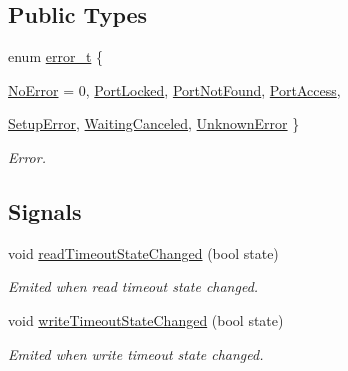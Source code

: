 \subsection*{Public Types}
\begin{DoxyCompactItemize}
\item 
enum \hyperlink{classmdt_abstract_port_ad4121bb930c95887e77f8bafa065a85e}{error\_\-t} \{ \par
\hyperlink{classmdt_abstract_port_ad4121bb930c95887e77f8bafa065a85eab898bd273effe5cb4ed1a399a2d4baad}{NoError} =  0, 
\hyperlink{classmdt_abstract_port_ad4121bb930c95887e77f8bafa065a85eaedd63daf0db75794bb8e8e467da9575c}{PortLocked}, 
\hyperlink{classmdt_abstract_port_ad4121bb930c95887e77f8bafa065a85ea54a896ba3ff98896390e87bfe1f29eb0}{PortNotFound}, 
\hyperlink{classmdt_abstract_port_ad4121bb930c95887e77f8bafa065a85eaee5a84e59e9dc5fcf27cac57068bb1f4}{PortAccess}, 
\par
\hyperlink{classmdt_abstract_port_ad4121bb930c95887e77f8bafa065a85ea3d692317af7125319f60204df3101307}{SetupError}, 
\hyperlink{classmdt_abstract_port_ad4121bb930c95887e77f8bafa065a85ea14c0ddb478968710cb057a70406e4888}{WaitingCanceled}, 
\hyperlink{classmdt_abstract_port_ad4121bb930c95887e77f8bafa065a85eacb8cc31d0b00dda9e25ed1cc1fa17871}{UnknownError}
 \}
\begin{DoxyCompactList}\small\item\em Error. \end{DoxyCompactList}\end{DoxyCompactItemize}
\subsection*{Signals}
\begin{DoxyCompactItemize}
\item 
\hypertarget{classmdt_abstract_port_a62c5e1f2beb6eddf740c8710ecb84ad1}{
void \hyperlink{classmdt_abstract_port_a62c5e1f2beb6eddf740c8710ecb84ad1}{readTimeoutStateChanged} (bool state)}
\label{classmdt_abstract_port_a62c5e1f2beb6eddf740c8710ecb84ad1}

\begin{DoxyCompactList}\small\item\em Emited when read timeout state changed. \end{DoxyCompactList}\item 
\hypertarget{classmdt_abstract_port_abd4a3e5738ac13167ddaafe95926ce4d}{
void \hyperlink{classmdt_abstract_port_abd4a3e5738ac13167ddaafe95926ce4d}{writeTimeoutStateChanged} (bool state)}
\label{classmdt_abstract_port_abd4a3e5738ac13167ddaafe95926ce4d}

\begin{DoxyCompactList}\small\item\em Emited when write timeout state changed. \end{DoxyCompactList}\end{DoxyCompactItemize}
